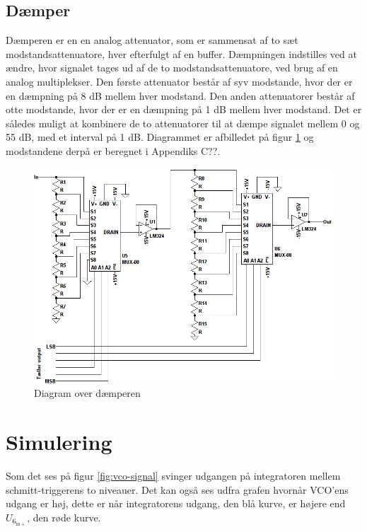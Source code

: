 \subsection*{Dæmper}
\label{volumenkontrol-design-daemper}
Dæmperen er en en analog attenuator, som er sammensat af to sæt modstandsattenuatore, hver efterfulgt af en buffer. Dæmpningen indstilles ved at ændre, hvor signalet tages ud af de to modstandsattenuatore, ved brug af en analog multiplekser. Den første attenuator består af syv modstande, hvor der er en dæmpning på 8 dB mellem hver modstand. Den anden attenuatorer består af otte modstande, hvor der er en dæmpning på 1 dB mellem hver modstand. Det er således muligt at kombinere de to attenuatorer til at dæmpe signalet mellem 0 og 55 dB, med et interval på 1 dB. Diagrammet er afbilledet på figur \ref{fig:volumenkontrol_daemper} og modstandene derpå er beregnet i Appendiks C??.

\begin{figure}[h]
\centering
\includegraphics[width=\textwidth]{teknisk/volumenkontrol/daemper.png}
\caption{Diagram over dæmperen}
\label{fig:volumenkontrol_daemper}
\end{figure}

\section{Simulering}
\label{volumenkontrol-simulering}

Som det ses på figur \ref{fig:vco-signal} svinger udgangen på integratoren mellem schmitt-triggerens to niveauer. Det kan også ses udfra grafen hvornår VCO'ens udgang er høj, dette er når integratorens udgang, den blå kurve, er højere end $U_{6_{\mathrm{in+}}}$, den røde kurve.

